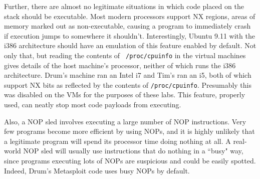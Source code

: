 Further, there are almost no legitimate situations in which code placed on the stack should be executable. Most modern
processors support NX regions, areas of memory marked out as non-executable, causing a program to immediately crash if
execution jumps to somewhere it shouldn't. Interestingly, Ubuntu 9.11 with the i386 architecture should have an
emulation of this feature enabled by default\cite{nx_bit}. Not only that, but reading the contents of {\tt
/proc/cpuinfo} in the virtual machines gives details of the host machine's processor, neither of which runs the i386
architecture. Drum's machine ran an Intel i7 and Tim's ran an i5, both of which support NX bits as reflected by the
contents of {\tt /proc/cpuinfo}. Presumably this was disabled on the VMs for the purposes of these labs. This feature,
properly used, can neatly stop most code payloads from executing.

Also, a NOP sled involves executing a large number of NOP instructions. Very few programs become more efficient by using
NOPs, and it is highly unlikely that a legitimate program will spend its processor time doing nothing at all. A
real-world NOP sled will usually use instructions that do nothing in a ``busy" way, since programs executing lots of
NOPs are suspicious and could be easily spotted. Indeed, Drum's Metasploit code uses busy NOPs by default.
